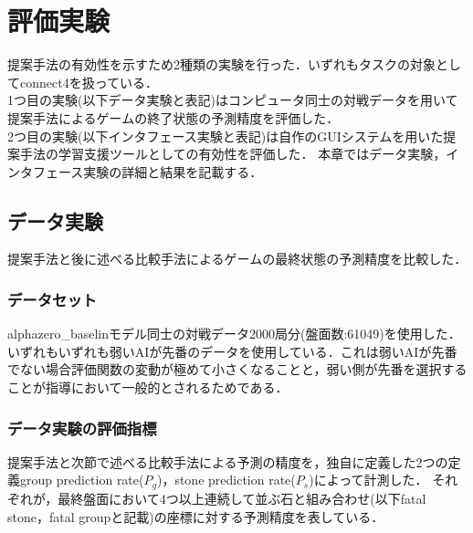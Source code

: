 \chapter{評価実験}
提案手法の有効性を示すため2種類の実験を行った．いずれもタスクの対象としてconnect4を扱っている．\\
1つ目の実験(以下データ実験と表記)はコンピュータ同士の対戦データを用いて提案手法によるゲームの終了状態の予測精度を評価した．\\
2つ目の実験(以下インタフェース実験と表記)は自作のGUIシステムを用いた提案手法の学習支援ツールとしての有効性を評価した．
本章ではデータ実験，インタフェース実験の詳細と結果を記載する．



\section{データ実験}
\label{chap:evaluation}
提案手法と後に述べる比較手法によるゲームの最終状態の予測精度を比較した．
\subsection{データセット}
alphazero\_baselinモデル同士の対戦データ2000局分(盤面数:61049)を使用した．いずれもいずれも弱いAIが先番のデータを使用している．これは弱いAIが先番でない場合評価関数の変動が極めて小さくなることと，弱い側が先番を選択することが指導において一般的とされるためである．



\subsection{データ実験の評価指標}
提案手法と次節で述べる比較手法による予測の精度を，独自に定義した2つの定義group prediction rate($P_g$)，stone prediction rate($P_s$)によって計測した．
それぞれが，最終盤面において4つ以上連続して並ぶ石と組み合わせ(以下fatal stone，fatal groupと記載)の座標に対する予測精度を表している．

